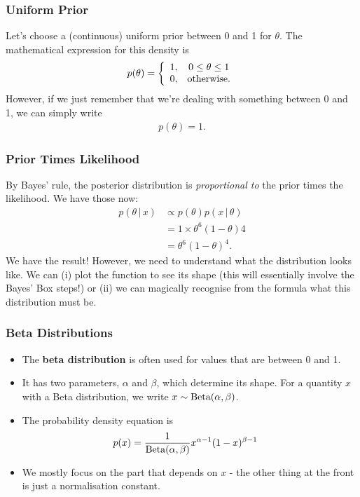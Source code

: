\documentclass{beamer}
\newcommand{\given}{\,|\,}
\begin{document}
\begin{frame}
\frametitle{Uniform Prior}
Let's choose a (continuous) uniform prior between 0 and 1 for $\theta$.
The mathematical expression for this density is
\begin{align}
p(\theta) = \left\{
                \begin{array}{cc}
                1, & 0 \leq \theta \leq 1 \\
                0, & \textnormal{otherwise}.
                \end{array}
            \right.
\end{align}
\pause
However, if we just remember that we're dealing with something between 0 and 1,
we can simply write
\begin{align}
p(\theta) = 1.
\end{align}

\end{frame}

\begin{frame}
\frametitle{Prior Times Likelihood}
By Bayes' rule, the posterior distribution is {\em proportional to}
the prior times the likelihood. We have those now:
\begin{align}
p(\theta \given x) &\propto p(\theta) p(x \given \theta) \\
                   &= 1 \times \theta^6(1-\theta)4 \\
                   &= \theta^6(1-\theta)^4.
\end{align}
\pause
We have the result! However, we need to understand what the distribution
looks like. We can (i) plot the function to see its shape (this will essentially
involve the Bayes' Box steps!) or (ii) we can magically recognise from the
formula what this distribution must be.

\end{frame}


\begin{frame}
\frametitle{Beta Distributions}

\begin{itemize}
\item The {\bf beta distribution} is often used for values that are between 0
and 1.\pause
\item It has two parameters, $\alpha$ and $\beta$, which determine its shape.
For a quantity $x$ with a Beta distribution, we write $x \sim \textnormal{Beta}(\alpha, \beta)$.\pause
\item The probability density equation is
\begin{align}
p(x) &= \frac{1}{\textnormal{Beta}(\alpha, \beta)}
            x^{\alpha - 1}(1-x)^{\beta - 1}
\end{align} \pause
\item We mostly focus on the part that depends on $x$ - the other thing
at the front is just a normalisation constant.
\end{itemize}

\end{frame}
\end{document}
